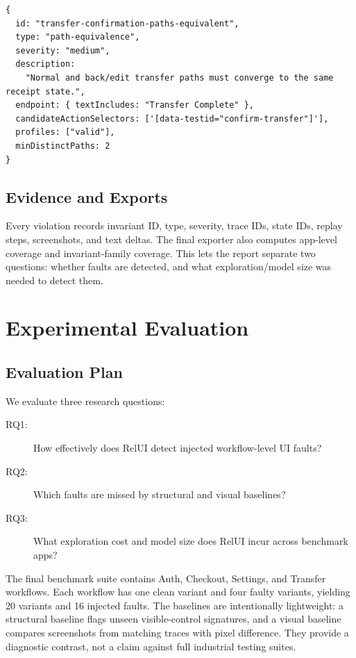 \documentclass[sigconf,nonacm]{acmart}
\newcommand{\RelUI}{RelUI\xspace}
\begin{document}
\begin{lstlisting}[caption={Transfer path-equivalence invariant from the final configuration.},label={lst:transfer-invariant}]
{
  id: "transfer-confirmation-paths-equivalent",
  type: "path-equivalence",
  severity: "medium",
  description:
    "Normal and back/edit transfer paths must converge to the same receipt state.",
  endpoint: { textIncludes: "Transfer Complete" },
  candidateActionSelectors: ['[data-testid="confirm-transfer"]'],
  profiles: ["valid"],
  minDistinctPaths: 2
}
\end{lstlisting}

\subsection{Evidence and Exports}
Every violation records invariant ID, type, severity, trace IDs, state IDs, replay steps, screenshots, and text deltas. The final exporter also computes app-level coverage and invariant-family coverage. This lets the report separate two questions: whether faults are detected, and what exploration/model size was needed to detect them.

\FloatBarrier
\section{Experimental Evaluation}\label{sec:eval}
\subsection{Evaluation Plan}
We evaluate three research questions:
\begin{description}
  \item[RQ1:] How effectively does \RelUI detect injected workflow-level UI faults?
  \item[RQ2:] Which faults are missed by structural and visual baselines?
  \item[RQ3:] What exploration cost and model size does \RelUI incur across benchmark apps?
\end{description}

The final benchmark suite contains Auth, Checkout, Settings, and Transfer workflows. Each workflow has one clean variant and four faulty variants, yielding 20 variants and 16 injected faults. The baselines are intentionally lightweight: a structural baseline flags unseen visible-control signatures, and a visual baseline compares screenshots from matching traces with pixel difference. They provide a diagnostic contrast, not a claim against full industrial testing suites.
\end{document}
